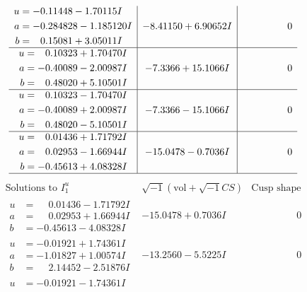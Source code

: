 \documentclass[1p]{elsarticle_modified}
\theoremstyle{definition}
\newcommand{\I}{\sqrt{-1}}
\begin{document}
$$\begin{array}{c|c|c}
\begin{aligned}
u &= -0.11448 - 1.70115 I \\
a &= -0.284828 - 1.185120 I \\
b &= \phantom{-}0.15081 + 3.05011 I\end{aligned}
 & -8.41150 + 6.90652 I & \phantom{-0.000000 } 0 \\ \hline\begin{aligned}
u &= \phantom{-}0.10323 + 1.70470 I \\
a &= -0.40089 - 2.00987 I \\
b &= \phantom{-}0.48020 + 5.10501 I\end{aligned}
 & -7.3366 + 15.1066 I & \phantom{-0.000000 } 0 \\ \hline\begin{aligned}
u &= \phantom{-}0.10323 - 1.70470 I \\
a &= -0.40089 + 2.00987 I \\
b &= \phantom{-}0.48020 - 5.10501 I\end{aligned}
 & -7.3366 - 15.1066 I & \phantom{-0.000000 } 0 \\ \hline\begin{aligned}
u &= \phantom{-}0.01436 + 1.71792 I \\
a &= \phantom{-}0.02953 - 1.66944 I \\
b &= -0.45613 + 4.08328 I\end{aligned}
 & -15.0478 - 0.7036 I & \phantom{-0.000000 } 0\\
 \hline 
 \end{array}$$\newpage$$\begin{array}{c|c|c}  
\text{Solutions to }I^u_{1}& \I (\text{vol} + \sqrt{-1}CS) & \text{Cusp shape}\\
 \hline 
\begin{aligned}
u &= \phantom{-}0.01436 - 1.71792 I \\
a &= \phantom{-}0.02953 + 1.66944 I \\
b &= -0.45613 - 4.08328 I\end{aligned}
 & -15.0478 + 0.7036 I & \phantom{-0.000000 } 0 \\ \hline\begin{aligned}
u &= -0.01921 + 1.74361 I \\
a &= -1.01827 + 1.00574 I \\
b &= \phantom{-}2.14452 - 2.51876 I\end{aligned}
 & -13.2560 - 5.5225 I & \phantom{-0.000000 } 0 \\ \hline\begin{aligned}
u &= -0.01921 - 1.74361 I \\

\end{aligned}
\end{array}$$
\end{document}
